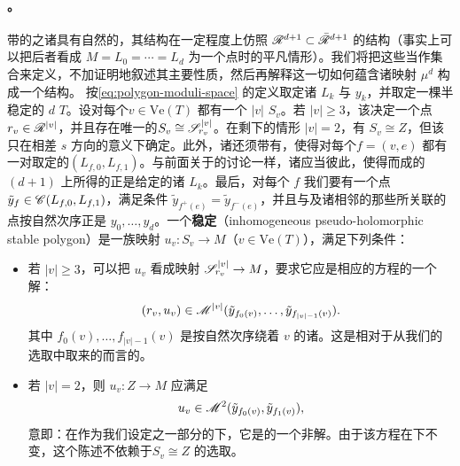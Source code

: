 \paragraph{\trCompactness。}\label{sub:compactness}
带\trLabel{}的\trInhomogeneous\trPseudoholomorphic\trPolygon{}之诸\trModuliSpace{}具有自然的\trGromov\trCompactification，其结构在一定程度上仿照 $\mathscr{R}^{d+1}\subset\bar{\mathscr{R}}^{d+1}$ 的结构（事实上可以把后者看成 $M=L_0=\cdots=L_d$ 为一个点时的平凡情形）。我们将把这些\trCompactification{}当作集合来定义，不加证明地叙述其主要\trTopology{}性质，然后再解释这一切如何蕴含诸映射 $\mu^d$ 构成一个\trAinfty{}结构。
按\eqref{eq:polygon-moduli-space} 的定义取定诸 $L_k$ 与 $y_k$，并取定一棵半稳定的 $d$ \trLeafedTree{}$T$。设对每个\trVertex{}$v\in\mathrm{Ve}(T)$ 都有一个 $|v|$ \trPointedDisc{}$S_v$。若 $|v|\ge 3$，该\trDisk{}决定一个点 $r_v\in\mathscr{R}^{|v|}$，并且存在唯一的\trIsomorphism{}$S_v\cong\mathscr{S}^{|v|}_{r_v}$。在剩下的情形 $|v|=2$，有 $S_v\cong Z$，但该\trIsomorphism{}只在相差 $s$ 方向\trTranslation{}的意义下确定。此外，诸\trDisk{}还须带有\trLagrange\trLabel，使得对每个\trFlag{}$f=(v,e)$ 都有一对取定的\trLagrange\trSubmanifold{}$(L_{f,0},L_{f,1})$。与前面关于\trGluing{}的讨论一样，诸\trLabel{}应当彼此\trCompatible，使得\trGluing{}而成的 $(d{+}1)$ \trPointedDisc{}上所得的\trLabel{}正是给定的诸 $L_k$。最后，对每个 $f$ 我们要有一个点 $\tilde{y}_f\in\mathscr{C}(L_{f,0},L_{f,1})$，满足条件 $\tilde{y}_{f^+(e)}=\tilde{y}_{f^-(e)}$，并且与\trRoot{}及诸\trLeaf{}相邻的那些\trFlag{}所关联的点按自然次序正是 $y_0,\ldots,y_d$。一个\textbf{\trInhomogeneous\trPseudoholomorphic{}稳定\trPolygon}（inhomogeneous pseudo-holomorphic stable polygon）是一族映射 $u_v\colon S_v\to M$（$v\in\mathrm{Ve}(T)$），满足下列条件：
\begin{itemize}
\item 若 $|v|\ge 3$，可以把 $u_v$ 看成映射 $\mathscr{S}^{|v|}_{r_v}\to M$，要求它应是相应的\trInhomogeneous\trPseudoholomorphicMap{}方程的一个解：
\begin{equation*}
(r_v,u_v)\in\mathscr{M}^{|v|}(\tilde{y}_{f_0(v)},\ldots,\tilde{y}_{f_{|v|-1}(v)}).
\end{equation*}
其中 $f_0(v),\ldots,f_{|v|-1}(v)$ 是按自然次序绕着 $v$ 的诸\trFlag。这是相对于从我们的\trUniversal{}选取中取来的\trPerturbationDatum{}而言的。
\item 若 $|v|=2$，则 $u_v\colon Z\to M$ 应满足
\begin{equation*}
u_v\in\mathscr{M}^2(\tilde{y}_{f_0(v)},\tilde{y}_{f_1(v)}),
\end{equation*}
意即：在作为我们设定之一部分的\trFloerDatum{}下，它是\trFloerEquation{}的一个非\trStationary{}解。由于该方程在\trTranslation{}下不变，这个陈述不依赖于\trIsomorphism{}$S_v\cong Z$ 的选取。
\end{itemize}
